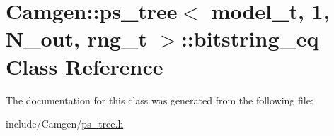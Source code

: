 \hypertarget{a00032}{\section{Camgen\-:\-:ps\-\_\-tree$<$ model\-\_\-t, 1, N\-\_\-out, rng\-\_\-t $>$\-:\-:bitstring\-\_\-eq Class Reference}
\label{a00032}
}


The documentation for this class was generated from the following file\-:\begin{DoxyCompactItemize}
\item 
include/\-Camgen/\hyperlink{a00718}{ps\-\_\-tree.\-h}\end{DoxyCompactItemize}
